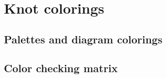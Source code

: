 \section{Knot colorings}

\subsection{Palettes and diagram colorings}



\subsection{Color checking matrix}



%
% 
%
%
%
% 
%
%
% 
%
%
%
%  
%
%
%  
